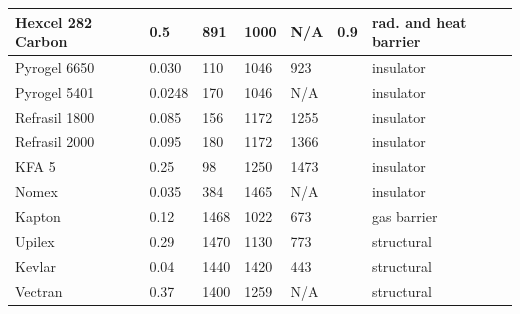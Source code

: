\begin{table}[H]
\begin{tabular}{|l|l|l|l|l|l|l|}
		Hexcel 282 Carbon & 0.5                                                   & 891                                        & 1000                                            & N/A 	 & 0.9      & rad. and heat barrier                                     \\ \hline
		Pyrogel 6650      & 0.030                                                 & 110                                        & 1046                                            & 923    & ~        & insulator                                  \\ \hline
		Pyrogel 5401      & 0.0248                                                & 170                                        & 1046                                            & N/A  	 & ~          & insulator                                 \\ \hline
		Refrasil 1800      & 0.085                                                 & 156                                        & 1172                                            & 1255 	 & ~           & insulator                                \\ \hline
		Refrasil 2000      & 0.095                                                 & 180                                        & 1172                                            & 1366 	 & ~            & insulator                               \\ \hline
		KFA 5             & 0.25                                                  & 98                                         & 1250                                            & 1473 	 & ~        & insulator                                   \\ \hline
		Nomex             & 0.035                                                  & 384                                         & 1465                                            & N/A 	 & ~        & insulator                                   \\ \hline
		Kapton            & 0.12                                                  & 1468                                       & 1022                                            & 673	 & ~            & gas barrier                              \\ \hline
		Upilex            & 0.29                                                  & 1470                                       & 1130                                            & 773 	 & ~             & structural                            \\ \hline
				Kevlar            & 0.04 & 1440                                       & 1420                                            & 443 	 & ~             & structural                            \\ \hline
		Vectran            & 0.37 & 1400 & 1259 & N/A 	 &  & structural                            \\ \hline
	\end{tabular}
	\label{tab:tpsmatprop}
\end{table}

